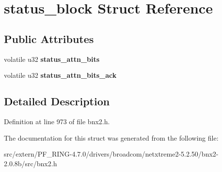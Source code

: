 \hypertarget{structstatus__block}{
\section{status\_\-block Struct Reference}
\label{structstatus__block}
}
\subsection*{Public Attributes}
\begin{DoxyCompactItemize}
\item 
\hypertarget{structstatus__block_a87614e34505b037990a10af84fd77162}{
volatile u32 {\bfseries status\_\-attn\_\-bits}}
\label{structstatus__block_a87614e34505b037990a10af84fd77162}

\item 
\hypertarget{structstatus__block_a12dbdc752594c2d86e2a8ec5885adad9}{
volatile u32 {\bfseries status\_\-attn\_\-bits\_\-ack}}
\label{structstatus__block_a12dbdc752594c2d86e2a8ec5885adad9}

\end{DoxyCompactItemize}


\subsection{Detailed Description}


Definition at line 973 of file bnx2.h.



The documentation for this struct was generated from the following file:\begin{DoxyCompactItemize}
\item 
src/extern/PF\_\-RING-\/4.7.0/drivers/broadcom/netxtreme2-\/5.2.50/bnx2-\/2.0.8b/src/bnx2.h\end{DoxyCompactItemize}
